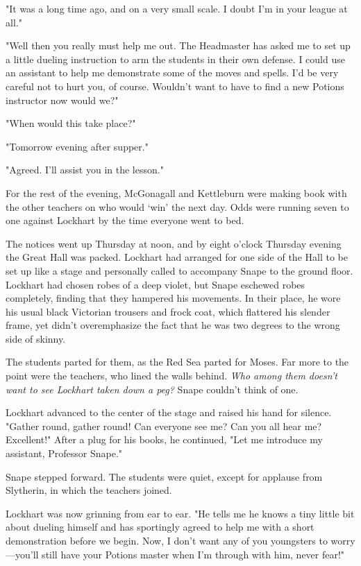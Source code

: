 "It was a long time ago, and on a very small scale. I doubt I'm in your league at all."

"Well then you really must help me out. The Headmaster has asked me to set up a little dueling instruction to arm the students in their own defense. I could use an assistant to help me demonstrate some of the moves and spells. I'd be very careful not to hurt you, of course. Wouldn't want to have to find a new Potions instructor now would we?"

"When would this take place?"

"Tomorrow evening after supper."

"Agreed. I'll assist you in the lesson."

For the rest of the evening, McGonagall and Kettleburn were making book with the other teachers on who would `win' the next day. Odds were running seven to one against Lockhart by the time everyone went to bed.

The notices went up Thursday at noon, and by eight o'clock Thursday evening the Great Hall was packed. Lockhart had arranged for one side of the Hall to be set up like a stage and personally called to accompany Snape to the ground floor. Lockhart had chosen robes of a deep violet, but Snape eschewed robes completely, finding that they hampered his movements. In their place, he wore his usual black Victorian trousers and frock coat, which flattered his slender frame, yet didn't overemphasize the fact that he was two degrees to the wrong side of skinny.

The students parted for them, as the Red Sea parted for Moses. Far more to the point were the teachers, who lined the walls behind. \emph{Who among them doesn't want to see Lockhart taken down a peg?} Snape couldn't think of one.

Lockhart advanced to the center of the stage and raised his hand for silence. "Gather round, gather round! Can everyone see me? Can you all hear me? Excellent!" After a plug for his books, he continued, "Let me introduce my assistant, Professor Snape."

Snape stepped forward. The students were quiet, except for applause from Slytherin, in which the teachers joined.

Lockhart was now grinning from ear to ear. "He tells me he knows a tiny little bit about dueling himself and has sportingly agreed to help me with a short demonstration before we begin. Now, I don't want any of you youngsters to worry—you'll still have your Potions master when I'm through with him, never fear!"

